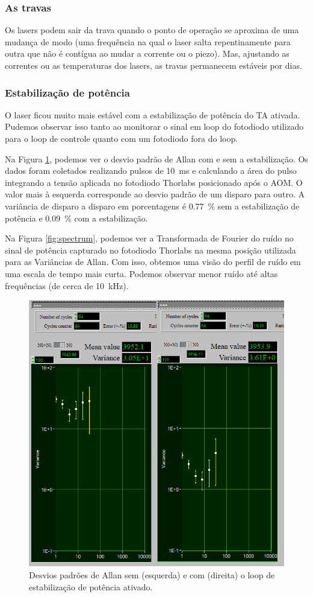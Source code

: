\subsubsection{As travas}
Os lasers podem sair da trava quando o ponto de operação se aproxima de uma mudança de modo (uma frequência na qual o laser salta repentinamente para outra que não é contígua ao mudar a corrente ou o piezo). Mas, ajustando as correntes ou as temperaturas dos lasers, as travas permanecem estáveis por dias.

\subsubsection{Estabilização de potência}
O laser ficou muito mais estável com a estabilização de potência do \gls{TA} ativada. Pudemos observar isso tanto ao monitorar o sinal em loop do fotodiodo utilizado para o loop de controle quanto com um fotodiodo fora do loop.

Na Figura \ref{fig:allan}, podemos ver o desvio padrão de Allan com e sem a estabilização. Os dados foram coletados realizando pulsos de \SI{10}{ms} e calculando a área do pulso integrando a tensão aplicada no fotodiodo Thorlabs posicionado após o \gls{AOM}. O valor mais à esquerda corresponde ao desvio padrão de um disparo para outro. A variância de disparo a disparo em porcentagens é \SI{0.77}{\percent} sem a estabilização de potência e \SI{0.09}{\percent} com a estabilização.

Na Figura \ref{fig:spectrum}, podemos ver a Transformada de Fourier do ruído no sinal de potência capturado no fotodiodo Thorlabs na mesma posição utilizada para as Variâncias de Allan. Com isso, obtemos uma visão do perfil de ruído em uma escala de tempo mais curta. Podemos observar menor ruído até altas frequências (de cerca de \SI{10}{kHz}).

\begin{figure}
    \centering
    \includegraphics[width=0.4\linewidth]{figures/allan_averages.png}
    \caption{Desvios padrões de Allan sem (esquerda) e com (direita) o loop de estabilização de potência ativado.}
    \label{fig:allan}
\end{figure}

